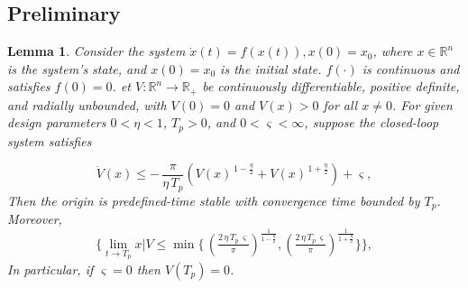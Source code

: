 \documentclass[pdflatex,sn-mathphys-num]{sn-jnl}%
\theoremstyle{thmstyleone}%
\newtheorem{lemma}{Lemma}
\newtheorem{assumption}{Assumption}
\theoremstyle{thmstyletwo}%
\theoremstyle{thmstylethree}%
\begin{document}





\subsection{Preliminary}


\begin{lemma} \label{lemma:1}\cite{WangEtAl_2022_Adaptivefuzzy} Consider the system $
	\dot{x}(t) = f(x(t)), x(0) = x_0
$, where $x \in \mathbb{R}^n$ is the system's state, and $x(0) = x_0$ is the initial state. $f(\cdot)$ is continuous and satisfies $f(0) = 0$. et $V:\mathbb{R}^n\to\mathbb{R}_+$ be continuously differentiable, positive definite, and radially unbounded, with $V(0)=0$ and $V(x)>0$ for all $x\neq 0$.
For given design parameters $0<\eta<1$, $T_p>0$, and $0<\varsigma<\infty$, suppose the closed-loop system satisfies
			  
\begin{equation}	\label{eq:7}
	\dot V(x) \le
	-\,\frac{\pi}{\eta\,T_p}\left(V(x)^{\,1-\frac{\eta}{2}}+V(x)^{\,1+\frac{\eta}{2}}\right)
	+\varsigma,
\end{equation}
Then the origin is predefined-time stable with convergence time bounded by $T_p$. Moreover,
\begin{equation}\label{eq:8}
	\Biggl\{ \lim_{t\to T_p} x|V
	\le
	\min\!\Biggl\{\,
	\left(\tfrac{2\,\eta\,T_p\,\varsigma}{\pi}\right)^{\frac{1}{1-\frac{\eta}{2}}}\!,
	\left(\tfrac{2\,\eta\,T_p\,\varsigma}{\pi}\right)^{\frac{1}{1+\frac{\eta}{2}}}
	\Biggr\} \Biggr\},
\end{equation}
In particular, if $\varsigma=0$ then $V(T_p)=0$.
\end{lemma}
\end{document}
